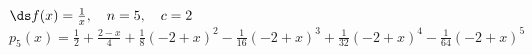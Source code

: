 {$\ds f(x) = \frac1x, \quad n=5, \quad c=2$
}
{$p_5(x) = \frac{1}{2}+\frac{2-x}{4}+\frac{1}{8} (-2+x)^2-\frac{1}{16}
   (-2+x)^3+\frac{1}{32} (-2+x)^4-\frac{1}{64} (-2+x)^5$
}